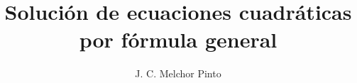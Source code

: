 \documentclass[12pt,addpoints]{guia}
\title{Solución de ecuaciones cuadráticas por fórmula general}
\author{J. C. Melchor Pinto}
\begin{document}
\thispagestyle{plain}
\addpoints
\INFO


\begin{questions}
    
\end{questions}

\vfill
\puntuacion
\end{document}
